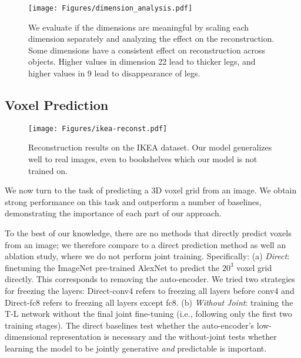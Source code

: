 \documentclass[runningheads]{llncs}
\begin{document}
\begin{figure}[t]
\centering
\texttt{[image: Figures/dimension\_analysis.pdf]}
\caption{We evaluate if the dimensions are meaningful by scaling each dimension
separately and analyzing the effect on the reconstruction. Some dimensions have 
a consistent effect on reconstruction across objects. Higher values
in dimension 22 lead to thicker legs, and higher values in 9 lead to disappearance of legs.}
\label{fig:dimscale}
\end{figure}\subsection{Voxel Prediction}\label{sec:exp_pred}\begin{figure}[t]
\texttt{[image: Figures/ikea-reconst.pdf]}
\caption{Reconstruction results on the IKEA dataset. 
Our model generalizes well to real images, even to bookshelves which our model is not trained on. 
}
\label{fig:IKEA}
\end{figure}We now turn to the task of predicting a 3D voxel grid from an image. We obtain
strong performance on this task and outperform a number of baselines,
demonstrating the importance of each part of our approach.

 To the best of our knowledge, there are no 
methods that directly predict voxels from an image; we therefore compare
to a direct prediction method as well an ablation study, where we do not
perform joint training. Specifically:
(a) {\it Direct}: finetuning the ImageNet pre-trained AlexNet to predict the $20^3$ 
voxel grid directly. This corresponds to removing the auto-encoder.
We tried two strategies for freezing the layers:
Direct-conv4 refers to freezing all layers before conv4
and Direct-fc8 refers to freezing all layers except fc8.
(b) {\it Without Joint}: training the T-L network without the final
joint fine-tuning (i.e., following only the first two training stages).
The direct baselines test whether the auto-encoder's low-dimensional representation is 
necessary and the without-joint tests whether learning the model to be jointly
generative {\it and} predictable is important.
\end{document}
